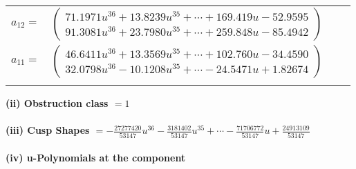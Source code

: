 \documentclass[1p]{elsarticle_modified}
\theoremstyle{definition}
\begin{document}
\begin{tabular}{m{7pt} m{180pt} m{7pt} m{180pt} }
\flushright $a_{12}=$&$\begin{pmatrix}71.1971 u^{36}+13.8239 u^{35}+\cdots+169.419 u-52.9595\\91.3081 u^{36}+23.7980 u^{35}+\cdots+259.848 u-85.4942\end{pmatrix}$ \\
\flushright $a_{11}=$&$\begin{pmatrix}46.6411 u^{36}+13.3569 u^{35}+\cdots+102.760 u-34.4590\\32.0798 u^{36}-10.1208 u^{35}+\cdots-24.5471 u+1.82674\end{pmatrix}$\\&\end{tabular}
\flushleft \textbf{(ii) Obstruction class $= 1$}\\~\\
\flushleft \textbf{(iii) Cusp Shapes $= -\frac{27277420}{53147} u^{36}-\frac{3181402}{53147} u^{35}+\cdots-\frac{71706772}{53147} u+\frac{24913109}{53147}$}\\~\\
\newpage\renewcommand{\arraystretch}{1}
\flushleft \textbf{(iv) u-Polynomials at the component}\newline \\
\end{document}
